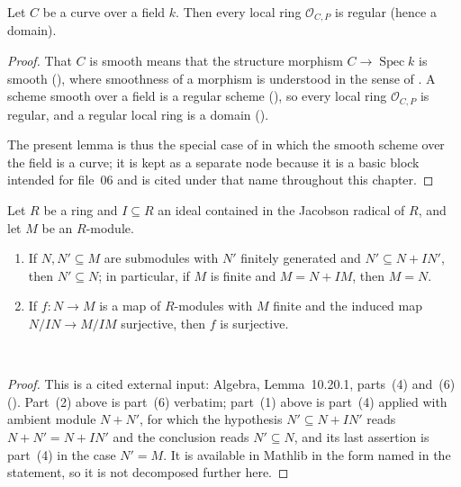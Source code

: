 \begin{lemma}
\label{lem:pcb-smooth-regular}
Let \(C\) be a  curve over a field
\(k\).  Then every local ring \(\mathcal O_{C,P}\) is regular (hence
a domain).
\end{lemma}
\begin{proof}
That \(C\) is smooth means that the structure morphism
\(C\to\operatorname{Spec}k\) is smooth (), where
smoothness of a morphism is understood in the sense of
.  A scheme smooth over a field is a
regular scheme (), so every
local ring \(\mathcal O_{C,P}\) is regular, and a regular local ring is
a domain ().

The present lemma is thus the special case of
 in which the smooth scheme over
the field is a curve; it is kept as a separate node because it is a
basic block intended for file~06 and is cited under that name
throughout this chapter.
\end{proof}

\begin{lemma}
\label{lem:pcb-nakayama}
Let \(R\) be a ring and \(I\subseteq R\) an ideal contained in the
Jacobson radical of \(R\), and let \(M\) be an \(R\)-module.
\begin{enumerate}
\item If \(N,N'\subseteq M\) are submodules with \(N'\) finitely
generated and \(N'\subseteq N+IN'\), then \(N'\subseteq N\); in
particular, if \(M\) is finite and \(M=N+IM\), then \(M=N\).
\item If \(f:N\to M\) is a map of \(R\)-modules with \(M\) finite and
the induced map \(N/IN\to M/IM\) surjective, then \(f\) is surjective.
\end{enumerate}
\mathlibok\ 
\end{lemma}
\begin{proof}
This is a cited external input: Algebra, Lemma~10.20.1, parts~(4)
and~(6) ().  Part~(2) above is part~(6) verbatim;
part~(1) above is part~(4) applied with ambient module \(N+N'\), for
which the hypothesis \(N'\subseteq N+IN'\) reads \(N+N'=N+IN'\) and the
conclusion reads \(N'\subseteq N\), and its last assertion is part~(4)
in the case \(N'=M\).  It is available in Mathlib in the form
named in the statement, so it is not decomposed further here.
\end{proof}


